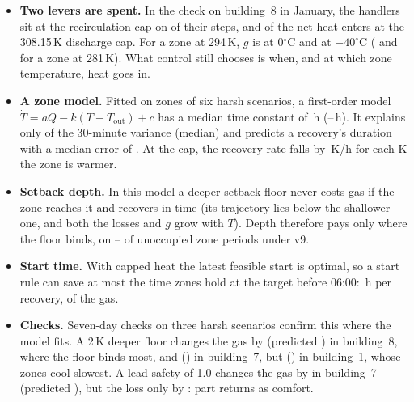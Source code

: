 \documentclass{article}
\begin{document}
\begin{itemize}
\item \textbf{Two levers are spent.} In the check on building~8 in January, the handlers sit at the recirculation cap on \RSevRecircCapShare{} of their steps, and \RSevCapHeatShare{} of the net heat enters at the 308.15\,K discharge cap. For a zone at 294\,K, $g$ is \RSevGZero{} at 0$^\circ$C and \RSevGMinusForty{} at $-40^\circ$C (\RSevGColdZero{} and \RSevGColdMinusForty{} for a zone at 281\,K). What control still chooses is when, and at which zone temperature, heat goes in.
\item \textbf{A zone model.} Fitted on \RSevNZones{} zones of six harsh scenarios, a first-order model $\dot T = aQ - k(T - T_{\text{out}}) + c$ has a median time constant of \RSevTauMed\,h (\RSevTauLo--\RSevTauHi\,h). It explains only \RSevRTwo{} of the 30-minute variance (median) and predicts a recovery's duration with a median error of \RSevRecErr. At the cap, the recovery rate falls by \RSevRateSlope\,K/h for each K the zone is warmer.
\item \textbf{Setback depth.} In this model a deeper setback floor never costs gas if the zone reaches it and recovers in time (its trajectory lies below the shallower one, and both the losses and $g$ grow with $T$). Depth therefore pays only where the floor binds, on \RSevBindLo--\RSevBindHi{} of unoccupied zone periods under v9.
\item \textbf{Start time.} With capped heat the latest feasible start is optimal, so a start rule can save at most the time zones hold at the target before 06:00: \RSevHoldH\,h per recovery, \RSevHoldGas{} of the gas.
\item \textbf{Checks.} Seven-day checks on three harsh scenarios confirm this where the model fits. A 2\,K deeper floor changes the gas by \RSevChkEightNleMeas{} (predicted \RSevChkEightNlePred) in building~8, where the floor binds most, and \RSevChkSevenNleMeas{} (\RSevChkSevenNlePred) in building~7, but \RSevChkOneNleMeas{} (\RSevChkOneNlePred) in building~1, whose zones cool slowest. A lead safety of 1.0 changes the gas by \RSevChkSevenLsOMeas{} in building~7 (predicted \RSevChkSevenLsOPred), but the loss only by \RSevChkSevenLsOLoss: part returns as comfort.
\end{itemize}
\end{document}
